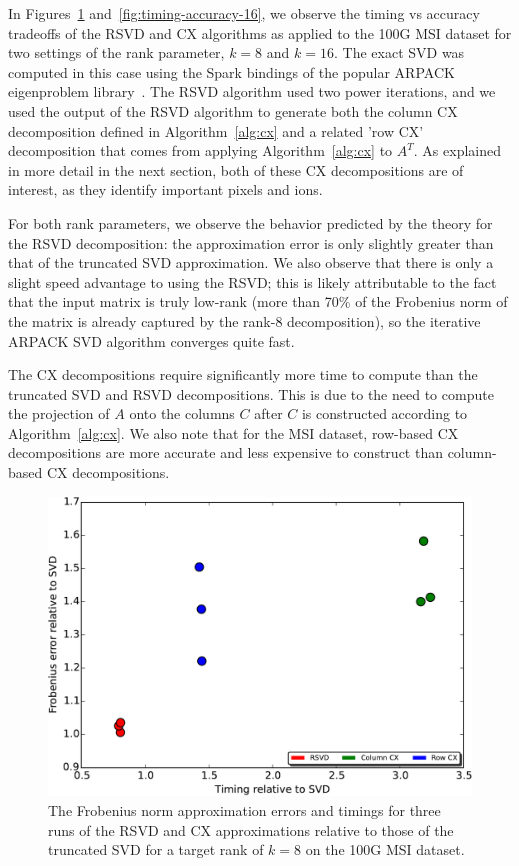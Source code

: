   In Figures~\ref{fig:timing-accuracy-8} and~\ref{fig:timing-accuracy-16}, we observe the timing vs accuracy tradeoffs of the RSVD and CX algorithms
  as applied to the 100G MSI dataset for two settings of the rank parameter, $k=8$ and $k=16.$ The exact SVD was computed in this case using the
  Spark bindings of the popular ARPACK eigenproblem library~\cite{ArpackUserGuide}. The RSVD algorithm used two power iterations, and we used the output of the RSVD algorithm to generate
  both the column CX decomposition defined in Algorithm~\ref{alg:cx} and a related 'row CX' decomposition that comes from applying Algorithm~\ref{alg:cx}
  to $A^T.$ As explained in more detail in the next section, both of these CX decompositions are of interest, as they identify important pixels and ions.

  For both rank parameters, we observe the behavior predicted by the theory for the RSVD decomposition: the approximation error is only slightly greater than that of the 
  truncated SVD approximation. We also observe that there is only a slight speed advantage to using the RSVD; this is likely attributable to the fact that the input matrix
  is truly low-rank (more than 70\% of the Frobenius norm of the matrix is already captured by the rank-8 decomposition), so the iterative ARPACK SVD algorithm converges 
  quite fast.

  The CX decompositions require significantly more time to compute than the truncated SVD and RSVD decompositions. This is due to the need to compute the projection of $A$ onto
  the columns $C$ after $C$ is constructed according to Algorithm~\ref{alg:cx}. We also note that for the MSI dataset, row-based CX decompositions are more 
  accurate and less expensive to construct than column-based CX decompositions. 

  \begin{figure}[h!btp]
    \begin{centering}
      \includegraphics[scale=0.4]{images/timing-accuracy-8}
      \end{centering}
      \caption{The Frobenius norm approximation errors and timings for three runs of the RSVD and CX approximations relative to those of the truncated SVD for a target rank of $k=8$ on the 100G MSI dataset.}
    \label{fig:timing-accuracy-8}
  \end{figure}

